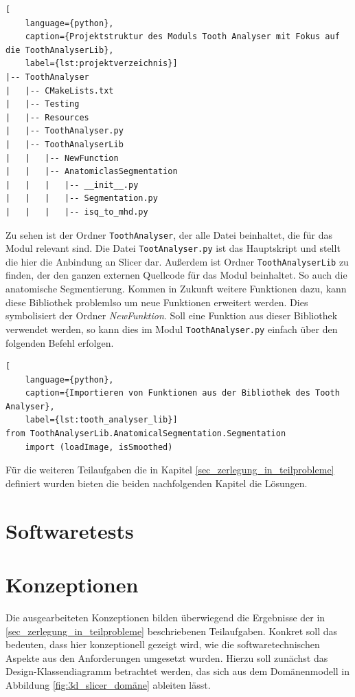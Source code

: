 \begin{lstlisting}[
    language={python},
    caption={Projektstruktur des Moduls Tooth Analyser mit Fokus auf die ToothAnalyserLib},
    label={lst:projektverzeichnis}]
|-- ToothAnalyser
|   |-- CMakeLists.txt
|   |-- Testing
|   |-- Resources
|   |-- ToothAnalyser.py
|   |-- ToothAnalyserLib
|   |   |-- NewFunction
|   |   |-- AnatomiclasSegmentation
|   |   |   |-- __init__.py
|   |   |   |-- Segmentation.py
|   |   |   |-- isq_to_mhd.py
\end{lstlisting}

Zu sehen ist der Ordner \texttt{ToothAnalyser}, der alle Datei beinhaltet, die
für das Modul relevant sind. Die Datei \texttt{TootAnalyser.py} ist das
Hauptskript und stellt die hier die Anbindung an Slicer dar. Außerdem ist Ordner
\texttt{ToothAnalyserLib} zu finden, der den ganzen externen Quellcode für das Modul
beinhaltet. So auch die anatomische Segmentierung. Kommen in Zukunft weitere Funktionen
dazu, kann diese Bibliothek problemlso um neue Funktionen erweitert werden. Dies
symbolisiert der Ordner \textsl{NewFunktion}. Soll eine Funktion aus dieser Bibliothek
verwendet werden, so kann dies im Modul \texttt{ToothAnalyser.py} einfach über den
folgenden Befehl erfolgen.

\begin{lstlisting}[
    language={python},
    caption={Importieren von Funktionen aus der Bibliothek des Tooth Analyser},
    label={lst:tooth_analyser_lib}]
from ToothAnalyserLib.AnatomicalSegmentation.Segmentation
	import (loadImage, isSmoothed)
\end{lstlisting}

Für die weiteren Teilaufgaben die in Kapitel \ref{sec_zerlegung_in_teilprobleme}
definiert wurden bieten die beiden nachfolgenden Kapitel die Lösungen.
\section{Softwaretests}

\pagebreak

\section{Konzeptionen}
\label{sec:konzeptionen} Die ausgearbeiteten Konzeptionen bilden überwiegend die
Ergebnisse der in \ref{sec_zerlegung_in_teilprobleme} beschriebenen Teilaufgaben.
Konkret soll das bedeuten, dass hier konzeptionell gezeigt wird, wie die
softwaretechnischen Aspekte aus den Anforderungen umgesetzt wurden. Hierzu soll zunächst
das Design-Klassendiagramm betrachtet werden, das sich aus dem Domänenmodell in
Abbildung \ref{fig:3d_slicer_domäne} ableiten lässt.

